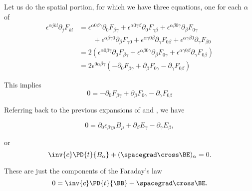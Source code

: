 Let us do the spatial portion, for which we have three equations, one for each \(\alpha\) of
%
\begin{equation}\label{eqn:relativisticElectrodynamicsL11b:1420}
\begin{aligned}
\epsilon^{\alpha j k l} \partial_j F_{k l}
&=
\epsilon^{\alpha 0 \beta \gamma} \partial_0 F_{\beta \gamma}
+\epsilon^{\alpha 0 \gamma \beta} \partial_0 F_{\gamma \beta}
+\epsilon^{\alpha \beta 0 \gamma} \partial_\beta F_{0 \gamma} \\
&\qquad +\epsilon^{\alpha \beta \gamma 0} \partial_\beta F_{\gamma 0}
+\epsilon^{\alpha \gamma 0 \beta} \partial_\gamma F_{0 \beta}
+\epsilon^{\alpha \gamma \beta 0} \partial_\gamma F_{\beta 0} \\
&=
2 \left(
\epsilon^{\alpha 0 \beta \gamma} \partial_0 F_{\beta \gamma}
+\epsilon^{\alpha \beta 0 \gamma} \partial_\beta F_{0 \gamma}
+\epsilon^{\alpha \gamma 0 \beta} \partial_\gamma F_{0 \beta}
\right) \\
&=
2 \epsilon^{0 \alpha \beta \gamma} \left(
-\partial_0 F_{\beta \gamma}
+\partial_\beta F_{0 \gamma}
- \partial_\gamma F_{0 \beta}
\right)
\end{aligned}
\end{equation}

This implies
%
\begin{equation}\label{eqn:relativisticElectrodynamicsL11:1320}
0 =
-\partial_0 F_{\beta \gamma}
+\partial_\beta F_{0 \gamma}
- \partial_\gamma F_{0 \beta}
\end{equation}

Referring back to the previous expansions of  and , we have

\begin{equation}\label{eqn:relativisticElectrodynamicsL11:1340}
0 =
\partial_0 \epsilon_{\beta\gamma\mu} B_\mu
+\partial_\beta E_\gamma
- \partial_\gamma E_{\beta},
\end{equation}

or
%
\begin{equation}\label{eqn:relativisticElectrodynamicsL11:1360}
\inv{c} \PD{t}{B_\alpha} + (\spacegrad \cross \BE)_\alpha = 0.
\end{equation}

These are just the components of the Faraday's law
%
\begin{equation}\label{eqn:relativisticElectrodynamicsL11:930}
0 = \inv{c} \PD{t}{\BB} + \spacegrad \cross \BE.
\end{equation}

